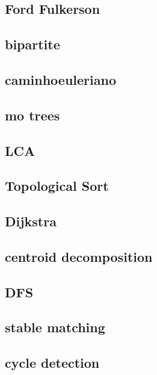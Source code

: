 \subsection{Ford Fulkerson}
\raggedbottom
\hrulefill
\subsection{bipartite}
\raggedbottom
\hrulefill
\subsection{caminhoeuleriano}
\raggedbottom
\hrulefill
\subsection{mo trees}
\raggedbottom
\hrulefill
\subsection{LCA}
\raggedbottom
\hrulefill
\subsection{Topological Sort}
\raggedbottom
\hrulefill
\subsection{Dijkstra}
\raggedbottom
\hrulefill
\subsection{centroid decomposition}
\raggedbottom
\hrulefill
\subsection{DFS}
\raggedbottom
\hrulefill
\subsection{stable matching}
\raggedbottom
\hrulefill
\subsection{cycle detection}
\raggedbottom
\hrulefill

